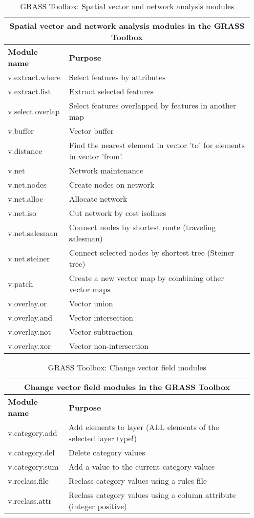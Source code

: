 \begin{table}[H]
\centering
 \begin{tabular}{|p{4cm}|p{10cm}|}
  \hline \multicolumn{2}{|c|}{\textbf{Spatial vector and network analysis modules in the GRASS
  Toolbox}} \\
  \hline \textbf{Module name} & \textbf{Purpose} \\
  \hline v.extract.where & Select features by attributes \\
  \hline v.extract.list & Extract selected features \\
  \hline v.select.overlap & Select features overlapped by features in another
  map\\
  \hline v.buffer & Vector buffer \\
  \hline v.distance & Find the nearest element in vector 'to' for elements in
  vector 'from'. \\
  \hline v.net & Network maintenance \\
  \hline v.net.nodes & Create nodes on network \\
  \hline v.net.alloc & Allocate network\\
  \hline v.net.iso & Cut network by cost isolines \\
  \hline v.net.salesman & Connect nodes by shortest route (traveling
  salesman) \\
  \hline v.net.steiner & Connect selected nodes by shortest tree (Steiner
  tree) \\
  \hline v.patch & Create a new vector map by combining other vector maps \\
  \hline v.overlay.or & Vector union \\
  \hline v.overlay.and & Vector intersection \\
  \hline v.overlay.not & Vector subtraction \\
  \hline v.overlay.xor & Vector non-intersection \\
\hline
\end{tabular}
\caption{GRASS Toolbox: Spatial vector and network analysis modules}
\end{table}


\begin{table}[H]
\centering
 \begin{tabular}{|p{4cm}|p{10cm}|}
  \hline \multicolumn{2}{|c|}{\textbf{Change vector field modules in the GRASS
  Toolbox}} \\
  \hline \textbf{Module name} & \textbf{Purpose} \\
  \hline v.category.add & Add elements to layer (ALL elements of the selected
  layer type!)\\
  \hline v.category.del & Delete category values \\
  \hline v.category.sum & Add a value to the current category values \\
  \hline v.reclass.file & Reclass category values using a rules file \\
  \hline v.reclass.attr & Reclass category values using a column attribute
  (integer positive) \\
\hline
\end{tabular}
\caption{GRASS Toolbox: Change vector field modules}
\end{table}


